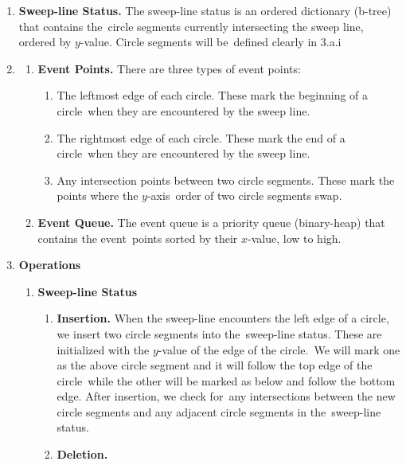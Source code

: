 \documentclass[11pt]{article}
\begin{document}
\begin{solution}
  \begin{enumerate}
    \item[1.]
      \textbf{Sweep-line Status.} The sweep-line status is an ordered dictionary (b-tree) that contains the\
      circle segments currently intersecting the sweep line, ordered by \(y\)-value. Circle segments will be\
      defined clearly in 3.a.i
    \item[2.]
      \begin{enumerate}
        \item \textbf{Event Points.} There are three types of event points:
          \begin{enumerate}
            \item The leftmost edge of each circle. These mark the beginning of a circle\
            when they are encountered by the sweep line.
            \item The rightmost edge of each circle. These mark the end of a circle\
            when they are encountered by the sweep line.
            \item Any intersection points between two circle segments. These mark the points where the \(y\)-axis\
            order of two circle segments swap.
          \end{enumerate}
        \item \textbf{Event Queue.} The event queue is a priority queue (binary-heap) that contains the event\
        points sorted by their \(x\)-value, low to high.
      \end{enumerate}
    \item[3.] \textbf{Operations}
      \begin{enumerate}
        \item \textbf{Sweep-line Status}
          \begin{enumerate}
            \item \textbf{Insertion.}
              When the sweep-line encounters the left edge of a circle, we insert two circle segments into the\
              sweep-line status. These are initialized with the \(y\)-value of the edge of the circle.\
              We will mark one as the above circle segment and it will follow the top edge of the circle\
              while the other will be marked as below and follow the bottom edge. After insertion, we check for\
              any intersections between the new circle segments and any adjacent circle segments in the\
              sweep-line status.
            \item \textbf{Deletion.}

\end{enumerate}
\end{enumerate}
\end{enumerate}
\end{solution}
\end{document}
